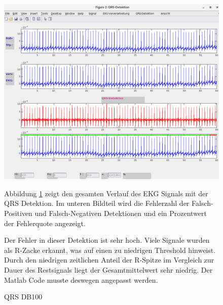 \documentclass[a4paper,12pt,titlepage]{scrartcl}
\begin{document}
\begin{figure}[ht]
    \begin{minipage}[t]{0.5\linewidth}
        \centering
        \includegraphics[width=0.9\linewidth, valign=t]{Assets/LaborBMT-16-14-54.png}
        \caption{QRS DB100}
        \label{qrsdb100}
    \end{minipage}%
    \begin{minipage}[t]{0.5\linewidth}
        Abbildung \ref{qrsdb100} zeigt den gesamten Verlauf des EKG Signals mit der QRS Detektion. Im unteren Bildteil wird die Fehlerzahl der Falsch-Positiven und Falsch-Negativen Detektionen und ein Prozentwert der Fehlerquote angezeigt.

        Der Fehler in dieser Detektion ist sehr hoch. Viele Signale wurden als R-Zacke erkannt, was auf einen zu niedrigen Threshold hinweist. Durch den niedrigen zeitlichen Anteil der R-Spitze im Vergleich zur Dauer des Restsignals liegt der Gesamtmittelwert sehr niedrig. Der Matlab Code musste deswegen angepasst werden.

    \end{minipage}
\end{figure}
\end{document}
